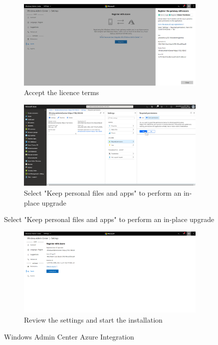 \begin{figure}[h]\ContinuedFloat
	\begin{subfigure}{0.5\textwidth}
		\captionsetup{width=0.8\linewidth}
		\includegraphics[width=0.9\linewidth]{img/WAC_Azure_4.png}
		\centering
		\caption{Accept the licence terms}
		\label{fig:WACAzure4}
	\end{subfigure}
	\begin{subfigure}{0.5\textwidth}
		\captionsetup{width=0.8\linewidth}
		\includegraphics[width=0.9\linewidth]{img/WAC_Azure_5.png} 
		\centering
		\caption{Select "Keep personal files and apps" to perform an in-place upgrade}
		\label{fig:WACAzure5}
	\end{subfigure}
\end{figure}
\begin{figure}[h]\ContinuedFloat
	\begin{subfigure}{\textwidth}
		\captionsetup{width=0.8\linewidth}
		\includegraphics[width=0.9\linewidth]{img/WAC_Azure_6.png}
		\centering
		\caption{Review the settings and start the installation}
		\label{fig:WACAzure6}
	\end{subfigure}
	\caption{Windows Admin Center Azure Integration}
	\label{fig:WACAzure}
\end{figure}